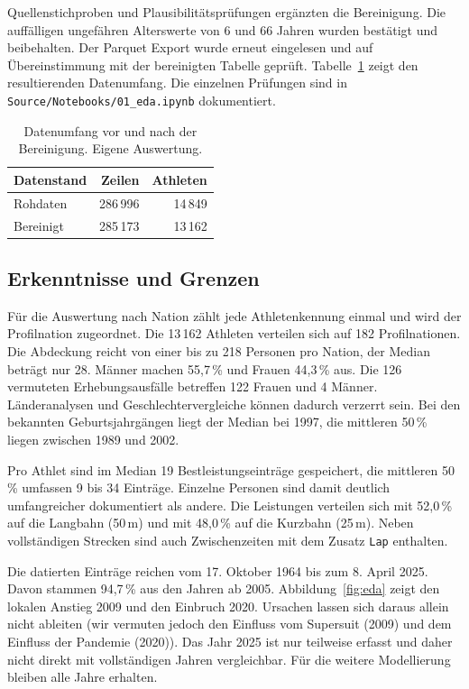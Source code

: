 Quellenstichproben und Plausibilitätsprüfungen ergänzten die Bereinigung.
Die auffälligen ungefähren Alterswerte von 6 und 66 Jahren wurden bestätigt und
beibehalten. Der Parquet Export wurde erneut eingelesen und auf
Übereinstimmung mit der bereinigten Tabelle geprüft. Tabelle~\ref{tab:datenumfang}
zeigt den resultierenden Datenumfang. Die einzelnen Prüfungen sind in
\nolinkurl{Source/Notebooks/01_eda.ipynb} dokumentiert.

\begin{table}[H]
  \centering
  \caption{Datenumfang vor und nach der Bereinigung. Eigene Auswertung.}
  \label{tab:datenumfang}
  \begin{tabular}{@{}lrr@{}}
    \toprule
    Datenstand & Zeilen & Athleten \\
    \midrule
    Rohdaten & 286\,996 & 14\,849 \\
    Bereinigt & 285\,173 & 13\,162 \\
    \bottomrule
  \end{tabular}
\end{table}

\subsection{Erkenntnisse und Grenzen}
Für die Auswertung nach Nation zählt jede Athletenkennung einmal und wird
der Profilnation zugeordnet. Die 13\,162 Athleten verteilen sich auf
182 Profilnationen. Die Abdeckung
reicht von einer bis zu 218 Personen pro Nation, der Median beträgt nur 28.
Männer machen 55,7\,\% und Frauen 44,3\,\% aus. Die 126 vermuteten
Erhebungsausfälle betreffen 122 Frauen und 4 Männer. Länderanalysen und
Geschlechtervergleiche können dadurch verzerrt sein. Bei den bekannten
Geburtsjahrgängen liegt der Median bei 1997, die mittleren 50\,\% liegen
zwischen 1989 und 2002.

Pro Athlet sind im Median 19 Bestleistungseinträge gespeichert, die mittleren
50\,\% umfassen 9 bis 34 Einträge. Einzelne Personen sind damit deutlich
umfangreicher dokumentiert als andere. Die Leistungen verteilen sich mit
52,0\,\% auf die Langbahn (50\,m) und mit 48,0\,\% auf die Kurzbahn (25\,m).
Neben vollständigen Strecken sind auch Zwischenzeiten mit dem Zusatz
\texttt{Lap} enthalten.

Die datierten Einträge reichen vom 17. Oktober 1964 bis zum 8. April 2025.
Davon stammen 94,7\,\% aus den Jahren ab 2005. Abbildung~\ref{fig:eda}
zeigt den lokalen Anstieg 2009 und den Einbruch 2020. Ursachen lassen sich
daraus allein nicht ableiten (wir vermuten jedoch den Einfluss vom Supersuit (2009) und dem Einfluss der Pandemie (2020)). Das Jahr 2025 ist nur teilweise erfasst und
daher nicht direkt mit vollständigen Jahren vergleichbar. Für die weitere
Modellierung bleiben alle Jahre erhalten.

